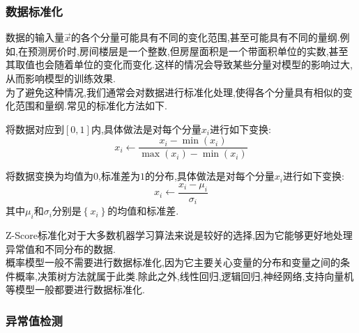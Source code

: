 \documentclass{ctexart}
\begin{document}
\subsubsection{数据标准化}
数据的输入量$\vec{x}$的各个分量可能具有不同的变化范围,甚至可能具有不同的量纲.例如,在预测房价时,房间楼层是一个整数,但房屋面积是一个带面积单位的实数,甚至其取值也会随着单位的变化而变化.这样的情况会导致某些分量对模型的影响过大,从而影响模型的训练效果.\\
\indent 为了避免这种情况,我们通常会对数据进行标准化处理,使得各个分量具有相似的变化范围和量纲.常见的标准化方法如下.
\begin{definition}[最小-最大缩放]
    将数据对应到$[0,1]$内,具体做法是对每个分量$x_i$进行如下变换:
    \[x_i\leftarrow\dfrac{x_i-\min(x_i)}{\max(x_i)-\min(x_i)}\]
\end{definition}
\begin{definition}[Z-Score标准化]
    将数据变换为均值为$0$,标准差为$1$的分布,具体做法是对每个分量$x_i$进行如下变换:
    \[x_i\leftarrow\dfrac{x_i-\mu_i}{\sigma_i}\]
    其中$\mu_i$和$\sigma_i$分别是$\left\{x_i\right\}$的均值和标准差.
\end{definition}
Z-Score标准化对于大多数机器学习算法来说是较好的选择,因为它能够更好地处理异常值和不同分布的数据.\\
\indent 概率模型一般不需要进行数据标准化,因为它主要关心变量的分布和变量之间的条件概率,决策树方法就属于此类.除此之外,线性回归,逻辑回归,神经网络,支持向量机等模型一般都要进行数据标准化.
\subsubsection{异常值检测}
\end{document}
